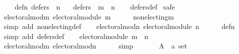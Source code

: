 \begin{isabellebody}
\ \ \ \ def{\isacharunderscore}{\kern0pt}{}{\isacharunderscore}{\kern0pt}n{\isacharcolon}{\kern0pt}\ {\isachardoublequoteopen}defers\ {}\ n{\isachardoublequoteclose}\isanewline
\ \ \ {\isachardoublequoteopen}defers\ {}\ {\isacharparenleft}{\kern0pt}m\ {\isasymtriangleright}\ n{\isacharparenright}{\kern0pt}{\isachardoublequoteclose}\isanewline
%
\isadelimproof
\ \ %
\endisadelimproof
%
\isatagproof
{}\isamarkupfalse%
\ defers{\isacharunderscore}{\kern0pt}def\isanewline
{}\isamarkupfalse%
\ {\isacharparenleft}{\kern0pt}safe{\isacharparenright}{\kern0pt}\isanewline
\ \ \isamarkupfalse%
\ electoral{\isacharunderscore}{\kern0pt}mod{\isacharunderscore}{\kern0pt}m{\isacharcolon}{\kern0pt}\ {\isachardoublequoteopen}electoral{\isacharunderscore}{\kern0pt}module\ m{\isachardoublequoteclose}\isanewline
\ \ \ \ \isamarkupfalse%
\ non{\isacharunderscore}{\kern0pt}electing{\isacharunderscore}{\kern0pt}m\isanewline
\ \ \ \ \isamarkupfalse%
\ {\isacharparenleft}{\kern0pt}simp\ add{\isacharcolon}{\kern0pt}\ non{\isacharunderscore}{\kern0pt}electing{\isacharunderscore}{\kern0pt}def{\isacharparenright}{\kern0pt}\isanewline
\ \ \isamarkupfalse%
\ electoral{\isacharunderscore}{\kern0pt}mod{\isacharunderscore}{\kern0pt}n{\isacharcolon}{\kern0pt}\ {\isachardoublequoteopen}electoral{\isacharunderscore}{\kern0pt}module\ n{\isachardoublequoteclose}\isanewline
\ \ \ \ \isamarkupfalse%
\ def{\isacharunderscore}{\kern0pt}{}{\isacharunderscore}{\kern0pt}n\isanewline
\ \ \ \ \isamarkupfalse%
\ {\isacharparenleft}{\kern0pt}simp\ add{\isacharcolon}{\kern0pt}\ defers{\isacharunderscore}{\kern0pt}def{\isacharparenright}{\kern0pt}\isanewline
\ \ \isamarkupfalse%
\ {\isachardoublequoteopen}electoral{\isacharunderscore}{\kern0pt}module\ {\isacharparenleft}{\kern0pt}m\ {\isasymtriangleright}\ n{\isacharparenright}{\kern0pt}{\isachardoublequoteclose}\isanewline
\ \ \ \ \isamarkupfalse%
\ electoral{\isacharunderscore}{\kern0pt}mod{\isacharunderscore}{\kern0pt}m\ electoral{\isacharunderscore}{\kern0pt}mod{\isacharunderscore}{\kern0pt}n\isanewline
\ \ \ \ \isamarkupfalse%
\ simp\isanewline
{}\isamarkupfalse%
\isanewline
\ \ \isamarkupfalse%
\isanewline
\ \ \ \ A\ {\isacharcolon}{\kern0pt}{\isacharcolon}{\kern0pt}\ {\isachardoublequoteopen}{\isacharprime}{\kern0pt}a\ set{\isachardoublequoteclose}\ \isanewline

\end{isabellebody}
